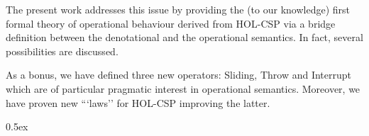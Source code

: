 \documentclass[11pt,a4paper]{book}
\begin{document}
   The present work addresses this issue by providing the (to our knowledge) first formal theory 
   of operational behaviour derived from HOL-CSP via a bridge definition between the 
   denotational and the operational semantics. In fact, several possibilities are discussed.
   
   As a bonus, we have defined three new operators: Sliding, Throw and Interrupt which are
   of particular pragmatic interest in operational semantics. Moreover, we have
   proven new ```laws'' for HOL-CSP improving the latter.


\tableofcontents

\parindent 0pt\parskip 0.5ex





\end{document}
